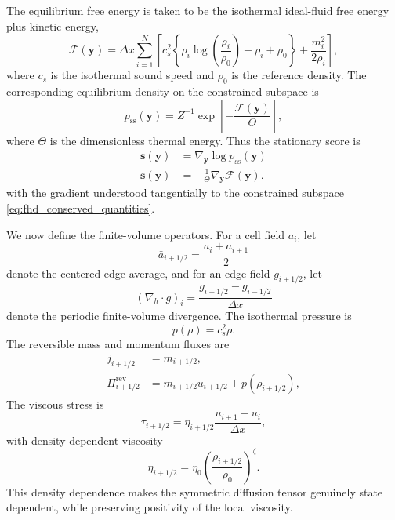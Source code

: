 \documentclass[11pt,twoside,fleqn]{article}
\begin{document}
The equilibrium free energy is taken to be the isothermal ideal-fluid free
energy plus kinetic energy,
\begin{equation}
    \mathcal{F}(\bm{y})
    =
    \Delta x
    \sum_{i=1}^{N}
    \left[
        c_s^2\!
        \left\{
            \rho_i\log\left(\frac{\rho_i}{\rho_0}\right)
            -\rho_i+\rho_0
        \right\}
        +
        \frac{m_i^2}{2\rho_i}
    \right],
    \label{eq:fhd_free_energy}
\end{equation}
where \(c_s\) is the isothermal sound speed and \(\rho_0\) is the reference
density. The corresponding equilibrium density on the constrained subspace is
\begin{equation}
    p_{\mathrm{ss}}(\bm{y})
    =
    Z^{-1}
    \exp\left[-\frac{\mathcal{F}(\bm{y})}{\Theta}\right],
    \label{eq:fhd_stationary_density}
\end{equation}
where \(\Theta\) is the dimensionless thermal energy. Thus the stationary score
is
\begin{align}
    \bm{s}(\bm{y})
    &=
    \nabla_{\bm{y}}\log p_{\mathrm{ss}}(\bm{y})
    \\
    \bm{s}(\bm{y})
    &=
    -\frac{1}{\Theta}\nabla_{\bm{y}}\mathcal{F}(\bm{y}).
    \label{eq:fhd_stationary_score}
\end{align}
with the gradient understood tangentially to the constrained subspace
\eqref{eq:fhd_conserved_quantities}.

We now define the finite-volume operators. For a cell field \(a_i\), let
\begin{equation}
    \bar a_{i+1/2}
    =
    \frac{a_i+a_{i+1}}{2}
    \label{eq:fhd_edge_average}
\end{equation}
denote the centered edge average, and for an edge field \(g_{i+1/2}\), let
\begin{equation}
    (\nabla_h\cdot g)_i
    =
    \frac{g_{i+1/2}-g_{i-1/2}}{\Delta x}
    \label{eq:fhd_discrete_divergence}
\end{equation}
denote the periodic finite-volume divergence. The isothermal pressure is
\begin{equation}
    p(\rho)=c_s^2\rho.
    \label{eq:fhd_pressure}
\end{equation}
The reversible mass and momentum fluxes are
\begin{align}
    j_{i+1/2}
    &=
    \bar m_{i+1/2},
    \\
    \Pi^{\mathrm{rev}}_{i+1/2}
    &=
    \bar m_{i+1/2}\bar u_{i+1/2}
    +
    p(\bar\rho_{i+1/2}),
    \label{eq:fhd_reversible_fluxes}
\end{align}
The viscous stress is
\begin{equation}
    \tau_{i+1/2}
    =
    \eta_{i+1/2}
    \frac{u_{i+1}-u_i}{\Delta x},
    \label{eq:fhd_viscous_stress}
\end{equation}
with density-dependent viscosity
\begin{equation}
    \eta_{i+1/2}
    =
    \eta_0
    \left(
        \frac{\bar\rho_{i+1/2}}{\rho_0}
    \right)^{\zeta}.
    \label{eq:fhd_density_dependent_viscosity}
\end{equation}
This density dependence makes the symmetric diffusion tensor genuinely
state dependent, while preserving positivity of the local viscosity.
\end{document}

